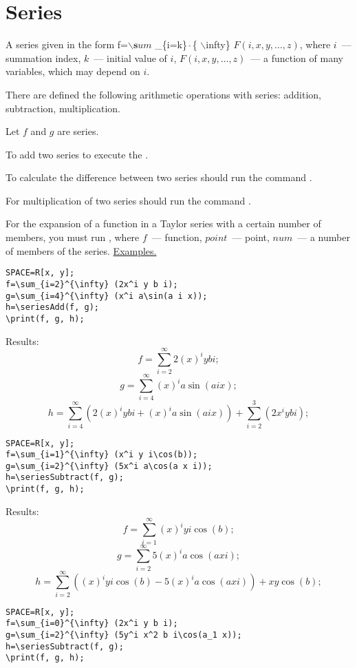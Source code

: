\chapter{ Series}   
A series given in the form f=$\backslash {\mathbf sum}$ \_\{i=k\} $\widehat{\ }{}$\{ $\backslash$infty\} $F(i, x, y,\ldots, z)$, where $i$~--- summation index, $k$~--- initial value of $i$,  $F(i, x, y,\ldots, z)$~---  a function of many variables, which may depend on $i$.

There are defined the following arithmetic operations with series:  addition, subtraction,  multiplication. 

Let $ f $ and $ g $ are series.
  

To add two series to execute the 
 . 


To calculate the difference between two series should run the command
. 

For multiplication of two series should run the command
 . 

For the expansion of a function in a Taylor series with a certain
number of members, you must run , where
$ f $~--- function, $ point $~--- point, $ num $~---  a number of members of the series.
\underline {Examples. }
\vspace*{-2mm}
\begin{verbatim}
SPACE=R[x, y];
f=\sum_{i=2}^{\infty} (2x^i y b i);
g=\sum_{i=4}^{\infty} (x^i a\sin(a i x));
h=\seriesAdd(f, g); 
\print(f, g, h);
\end{verbatim}

Results:\\
$$f = \sum_{i=2}^{\infty} 2(x)^iybi;$$
$$g = \sum_{i=4}^{\infty} (x)^ia\sin(aix);$$
$$h = \sum_{i=4}^{\infty} (2(x)^iybi+(x)^ia\sin(aix))+\sum_{i=2}^{3}(2x^iybi);$$

\begin{verbatim}
SPACE=R[x, y];
f=\sum_{i=1}^{\infty} (x^i y i\cos(b));
g=\sum_{i=2}^{\infty} (5x^i a\cos(a x i));
h=\seriesSubtract(f, g); 
\print(f, g, h);
\end{verbatim}

Results:\\
$$f = \sum_{i=1}^{\infty} (x)^iyi\cos(b);$$
$$g = \sum_{i=2}^{\infty} 5(x)^ia\cos(axi);$$
$$h = \sum_{i=2}^{\infty} ((x)^iyi\cos(b)-5(x)^ia\cos(axi))+xy\cos(b);$$
\begin{verbatim}
SPACE=R[x, y];
f=\sum_{i=0}^{\infty} (2x^i y b i);
g=\sum_{i=2}^{\infty} (5y^i x^2 b i\cos(a_1 x));
h=\seriesSubtract(f, g); 
\print(f, g, h);
\end{verbatim}


